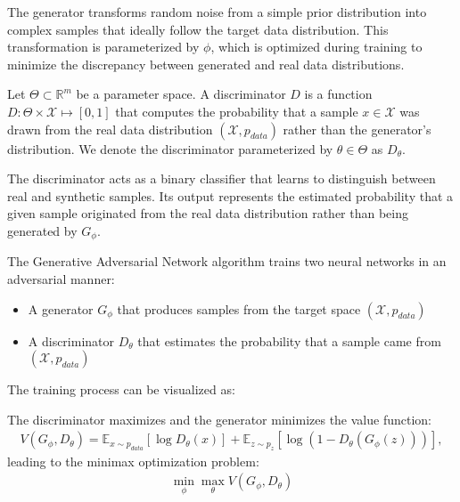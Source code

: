 The generator transforms random noise from a simple prior distribution into complex samples that ideally follow the target data distribution. This transformation is parameterized by $\phi$, which is optimized during training to minimize the discrepancy between generated and real data distributions.

\begin{definition}%
  \label{def:discriminator}
  Let $\Theta \subset \mathbb{R}^m$ be a parameter space. A \textnormal{\sffamily discriminator} $D$ is a function $D: \Theta \times \mathcal{X} \mapsto [0, 1]$ that computes the probability that a sample $x \in \mathcal{X}$ was drawn from the real data distribution $(\mathcal{X}, p_{data})$ rather than the generator's distribution. We denote the discriminator parameterized by $\theta \in \Theta$ as $D_\theta$.
\end{definition}

The discriminator acts as a binary classifier that learns to distinguish between real and synthetic samples. Its output represents the estimated probability that a given sample originated from the real data distribution rather than being generated by $G_\phi$.

\begin{definition}
  The \textnormal{\sffamily Generative Adversarial Network} algorithm trains two neural networks in an adversarial manner:
  \begin{itemize}
    \item A generator $G_\phi$ that produces samples from the target space $(\mathcal{X}, p_{data})$
    \item A discriminator $D_\theta$ that estimates the probability that a sample came from $(\mathcal{X}, p_{data})$
  \end{itemize}
  
  The training process can be visualized as:
  \begin{center}
  \end{center}
  
  The discriminator maximizes and the generator minimizes the value function:
  \begin{align}
    \label{eq:intro-V}
    V(G_\phi, D_\theta) = \mathbb{E}_{x \sim p_{data}}[\log D_\theta(x)] + \mathbb{E}_{z \sim p_z}[\log(1 - D_\theta(G_\phi(z)))],
  \end{align}
  leading to the minimax optimization problem:
  \begin{align}
    \min_{\phi} \max_{\theta} V(G_\phi, D_\theta)
  \end{align}
\end{definition}

